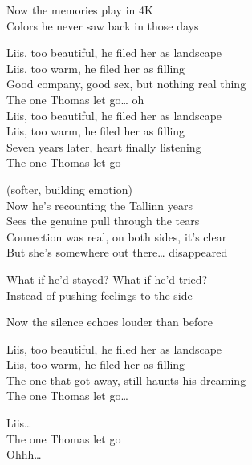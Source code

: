 \begin{lyrics}
Now the memories play in 4K\\
Colors he never saw back in those days

Liis, too beautiful, he filed her as landscape\\
Liis, too warm, he filed her as filling\\
Good company, good sex, but nothing real thing\\
The one Thomas let go… oh\\
Liis, too beautiful, he filed her as landscape\\
Liis, too warm, he filed her as filling\\
Seven years later, heart finally listening\\
The one Thomas let go

(softer, building emotion)\\
Now he’s recounting the Tallinn years\\
Sees the genuine pull through the tears\\
Connection was real, on both sides, it’s clear\\
But she’s somewhere out there… disappeared

What if he’d stayed? What if he’d tried?\\
Instead of pushing feelings to the side

Now the silence echoes louder than before

Liis, too beautiful, he filed her as landscape\\
Liis, too warm, he filed her as filling\\
The one that got away, still haunts his dreaming\\
The one Thomas let go…

Liis…\\
The one Thomas let go\\
Ohhh…
\end{lyrics}

